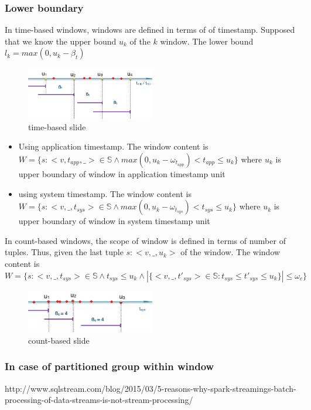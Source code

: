 \subsubsection{Lower boundary}

In time-based windows, windows are defined in terms of of timestamp. Supposed that we know the upper bound $u_k$ of the $k$ window. The lower bound $l_k = max(0, u_k - \beta_t)$

\begin{figure}[htbp!] 
\centering    
\includegraphics[width=0.5\textwidth]{timebased_slide}
\caption{time-based slide}
\label{fig:timebased_window}
\end{figure}

\begin{itemize}
\item Using application timestamp. The window content is $W = \{s:<v, t_{app},\_> \in \mathbb{S} \wedge max(0, u_k - \omega_{t_{app}}) < t_{app} \leq u_k\}$ where $u_k$ is upper boundary of window in application timestamp unit


\item using system timestamp. The window content is $W = \{s:<v,\_, t_{sys}> \in \mathbb{S} \wedge max (0, u_k - \omega_{t_{sys}}) < t_{sys} \leq u_k\}$ where $u_k$ is upper boundary of window in system timestamp unit
\end{itemize} 


In count-based windows, the scope of window is defined in terms of number of tuples. Thus, given the last tuple $s:<v, \_, u_k>$ of the window. The window content is 
$W=\{s:<v, \_, t_{sys}> \in \mathbb{S} \wedge t_{sys} \leq u_k \wedge  |\{<v,\_,t'_{sys}> \in \mathbb{S} : t_{sys} \leq t'_{sys} \leq u_k\}| \leq \omega_c \}$

\begin{figure}[htbp!] 
\centering    
\includegraphics[width=0.5\textwidth]{countbased_slide}
\caption{count-based slide}
\label{fig:countbased_slide}
\end{figure}


\subsubsection*{In case of partitioned group within window}



http://www.sqlstream.com/blog/2015/03/5-reasons-why-spark-streamings-batch-processing-of-data-streams-is-not-stream-processing/